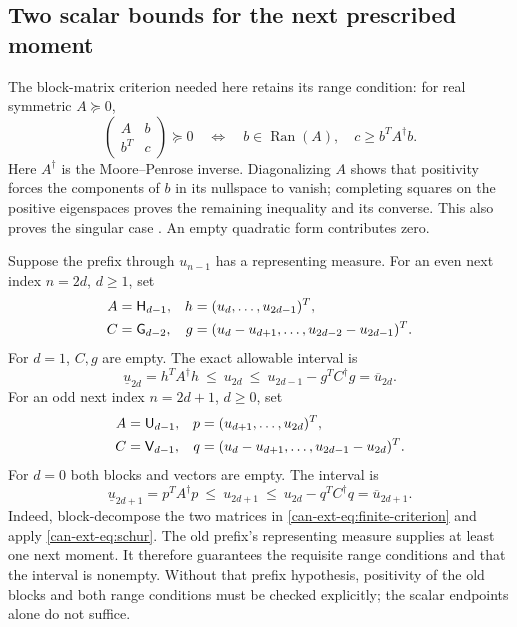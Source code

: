 \documentclass[11pt,a4paper]{article}
\numberwithin{equation}{section}
\theoremstyle{definition}
\theoremstyle{remark}
\begin{document}
\subsection{Two scalar bounds for the next prescribed moment}

The block-matrix criterion needed here retains its range condition:
for real symmetric $A\succeq0$,
\begin{equation}\label{can-ext-eq:schur}
 \begin{pmatrix}A&b\\b^T&c\end{pmatrix}\succeq0
 \quad\Longleftrightarrow\quad
 b\in\operatorname{Ran}(A),\quad c\geq b^TA^\dagger b.
\end{equation}
Here $A^\dagger$ is the Moore--Penrose inverse. Diagonalizing $A$
shows that positivity forces the components of $b$ in its nullspace
to vanish; completing squares on the positive eigenspaces proves
the remaining inequality and its converse. This also proves the
singular case \cite[Lemma~2.3]{curto-fialkow}. An empty quadratic
form contributes zero.

Suppose the prefix through $u_{n-1}$ has a representing measure.
For an even next index $n=2d$, $d\geq1$, set
\begin{align}
 A&=\mathsf H_{d-1},& h&=(u_d,\ldots,u_{2d-1})^T,\notag\\
 C&=\mathsf G_{d-2},&
 g&=(u_d-u_{d+1},\ldots,u_{2d-2}-u_{2d-1})^T.
 \label{can-ext-eq:even-data}
\end{align}
For $d=1$, $C,g$ are empty. The exact allowable interval is
\begin{equation}\label{can-ext-eq:even-interval}
 \underline u_{2d}=h^TA^\dagger h
 \ \leq\ u_{2d}\ \leq\
 u_{2d-1}-g^TC^\dagger g=\overline u_{2d}.
\end{equation}
For an odd next index $n=2d+1$, $d\geq0$, set
\begin{align}
 A&=\mathsf U_{d-1},& p&=(u_{d+1},\ldots,u_{2d})^T,\notag\\
 C&=\mathsf V_{d-1},&
 q&=(u_d-u_{d+1},\ldots,u_{2d-1}-u_{2d})^T.
 \label{can-ext-eq:odd-data}
\end{align}
For $d=0$ both blocks and vectors are empty. The interval is
\begin{equation}\label{can-ext-eq:odd-interval}
 \underline u_{2d+1}=p^TA^\dagger p
 \ \leq\ u_{2d+1}\ \leq\
 u_{2d}-q^TC^\dagger q=\overline u_{2d+1}.
\end{equation}
Indeed, block-decompose the two matrices in
\eqref{can-ext-eq:finite-criterion} and apply \eqref{can-ext-eq:schur}.
The old prefix's representing measure supplies at least one next
moment. It therefore guarantees the requisite range conditions and
that the interval is nonempty. Without that prefix hypothesis,
positivity of the old blocks and both range conditions must be
checked explicitly; the scalar endpoints alone do not suffice.
\end{document}
